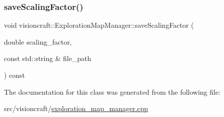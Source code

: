 \subsubsection{\texorpdfstring{save\+Scaling\+Factor()}{saveScalingFactor()}}
{\footnotesize\ttfamily void visioncraft\+::\+Exploration\+Map\+Manager\+::save\+Scaling\+Factor (\begin{DoxyParamCaption}\item[{double}]{scaling\+\_\+factor,  }\item[{const std\+::string \&}]{file\+\_\+path }\end{DoxyParamCaption}) const\hspace{0.3cm}{\ttfamily [inline]}}



The documentation for this class was generated from the following file\+:\begin{DoxyCompactItemize}
\item 
src/visioncraft/\hyperlink{exploration__map__manager_8cpp}{exploration\+\_\+map\+\_\+manager.\+cpp}\end{DoxyCompactItemize}
